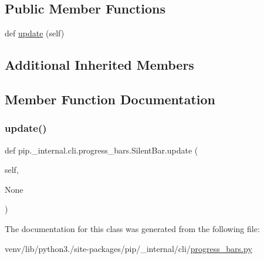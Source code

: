 \subsection*{Public Member Functions}
\begin{DoxyCompactItemize}
\item 
def \hyperlink{classpip_1_1__internal_1_1cli_1_1progress__bars_1_1SilentBar_a2576a60f623d878edebbac9d03112ab9}{update} (self)
\end{DoxyCompactItemize}
\subsection*{Additional Inherited Members}


\subsection{Member Function Documentation}
\mbox{\label{classpip_1_1__internal_1_1cli_1_1progress__bars_1_1SilentBar_a2576a60f623d878edebbac9d03112ab9}} 
\subsubsection{\texorpdfstring{update()}{update()}}
{\footnotesize\ttfamily def pip.\+\_\+internal.\+cli.\+progress\+\_\+bars.\+Silent\+Bar.\+update (\begin{DoxyParamCaption}\item[{}]{self,  }\item[{}]{None }\end{DoxyParamCaption})}



The documentation for this class was generated from the following file\+:\begin{DoxyCompactItemize}
\item 
venv/lib/python3./site-\/packages/pip/\+\_\+internal/cli/\hyperlink{progress__bars_8py}{progress\+\_\+bars.\+py}\end{DoxyCompactItemize}
